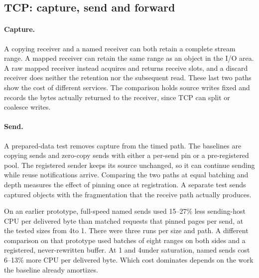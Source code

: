 \subsection{TCP: capture, send and forward}
\label{sec:eval:tcp}
\label{sec:eval:rx}
\label{sec:eval:ubiquitous}
\label{sec:eval:tx}
\label{sec:eval:fwd}

\paragraph{Capture.} A copying receiver and a named receiver can both retain a
complete stream range. A mapped receiver can retain the same range as an object
in the I/O area. A raw mapped receiver instead acquires and returns receive
slots, and a discard receiver does neither the retention nor the subsequent
read. These last two paths show the cost of different services. The comparison
holds source writes fixed and records the bytes actually returned to the
receiver, since TCP can split or coalesce writes.

\paragraph{Send.} A prepared-data test removes capture from the timed path.
The baselines are copying sends and zero-copy sends with either a per-send pin
or a pre-registered pool. The registered sender keeps its source unchanged, so
it can continue sending while reuse notifications arrive. Comparing the two
\sendzc paths at equal batching and depth measures the effect of pinning once
at registration. A separate test sends captured objects
with the fragmentation that the receive path actually produces.

On an earlier prototype, full-speed named sends used 15--27\% less sending-host
CPU per delivered byte than matched \sendzc requests that pinned pages per send,
at the tested sizes from 4\KiB to 1\MiB. There were three runs per size and path.
A different comparison on that prototype used batches of eight ranges on both
sides and a registered, never-rewritten buffer. At 1 and 4\KiB under saturation,
named sends cost 6--13\% more CPU per delivered byte. Which cost dominates
depends on the work the baseline already amortizes.

